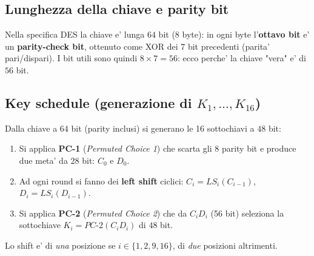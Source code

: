 \subsection{Lunghezza della chiave e parity bit}
Nella specifica DES la chiave e' lunga $ 64 $ bit ($ 8 $ byte): in ogni byte l'\textbf{ottavo bit} e' un \textbf{parity-check bit}, ottenuto come XOR dei $ 7 $ bit precedenti (parita' pari/dispari). I bit utili sono quindi $ 8 \times 7 = 56 $: ecco perche' la chiave "vera" e' di $ 56 $ bit.

\subsection{Key schedule (generazione di $K_1,\dots,K_{16}$)}
Dalla chiave a $ 64 $ bit (parity inclusi) si generano le 16 sottochiavi a $ 48 $ bit:
\begin{enumerate}
  \item Si applica \textbf{PC-1} (\textit{Permuted Choice 1}) che scarta gli $ 8 $ parity bit e produce due meta' da $ 28 $ bit: $ C_0 $ e $ D_0 $.
  \item Ad ogni round si fanno dei \textbf{left shift} ciclici: $ C_i = LS_i(C_{i-1}) $, $ D_i = LS_i(D_{i-1}) $.
  \item Si applica \textbf{PC-2} (\textit{Permuted Choice 2}) che da $ C_i D_i $ (56 bit) seleziona la sottochiave $ K_i = PC\text{-}2(C_i D_i) $ di $ 48 $ bit.
\end{enumerate}
Lo shift e' di \textit{una} posizione se $ i \in \{1, 2, 9, 16\} $, di \textit{due} posizioni altrimenti.
